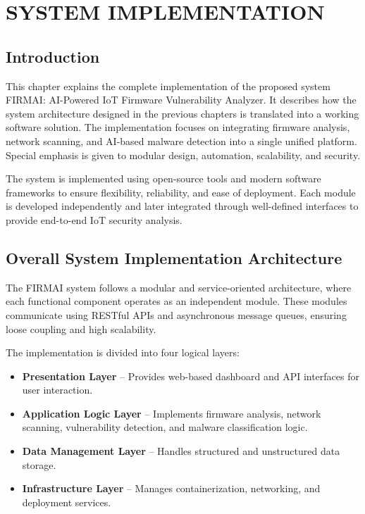 \chapter{SYSTEM IMPLEMENTATION}

\section{Introduction}
This chapter explains the complete implementation of the proposed system FIRMAI: AI-Powered IoT Firmware Vulnerability Analyzer. It describes how the system architecture designed in the previous chapters is translated into a working software solution. The implementation focuses on integrating firmware analysis, network scanning, and AI-based malware detection into a single unified platform. Special emphasis is given to modular design, automation, scalability, and security.

The system is implemented using open-source tools and modern software frameworks to ensure flexibility, reliability, and ease of deployment. Each module is developed independently and later integrated through well-defined interfaces to provide end-to-end IoT security analysis.

\section{Overall System Implementation Architecture}
The FIRMAI system follows a modular and service-oriented architecture, where each functional component operates as an independent module. These modules communicate using RESTful APIs and asynchronous message queues, ensuring loose coupling and high scalability.

The implementation is divided into four logical layers:
\begin{itemize}
	\item \textbf{Presentation Layer} -- Provides web-based dashboard and API interfaces for user interaction.
	\item \textbf{Application Logic Layer} -- Implements firmware analysis, network scanning, vulnerability detection, and malware classification logic.
	\item \textbf{Data Management Layer} -- Handles structured and unstructured data storage.
	\item \textbf{Infrastructure Layer} -- Manages containerization, networking, and deployment services.
\end{itemize}

